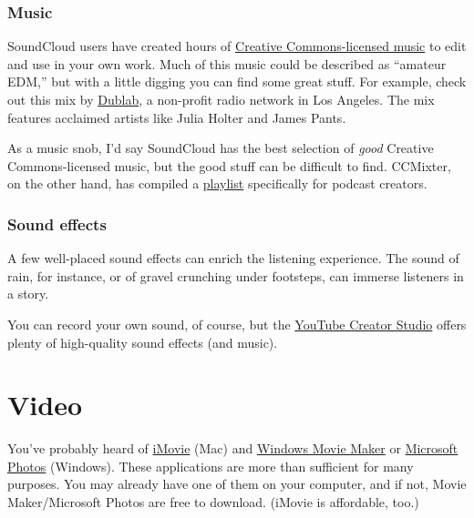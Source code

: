 \documentclass[]{book}
\theoremstyle{definition}
\theoremstyle{definition}
\theoremstyle{definition}
\theoremstyle{remark}
\begin{document}
\hypertarget{music}{%
\subsection{Music}\label{music}}

SoundCloud users have created hours of
\href{https://search.creativecommons.org/}{Creative Commons-licensed
music} to edit and use in your own work. Much of this music could be
described as ``amateur EDM,'' but with a little digging you can find
some great stuff. For example, check out this mix by
\href{https://soundcloud.com/wearecc/dublabs-cc10-mix}{Dublab}, a
non-profit radio network in Los Angeles. The mix features acclaimed
artists like Julia Holter and James Pants.

As a music snob, I'd say SoundCloud has the best selection of
\emph{good} Creative Commons-licensed music, but the good stuff can be
difficult to find. CCMixter, on the other hand, has compiled a
\href{http://dig.ccmixter.org/podcast_music}{playlist} specifically for
podcast creators.

\hypertarget{sound-effects}{%
\subsection{Sound effects}\label{sound-effects}}

A few well-placed sound effects can enrich the listening experience. The
sound of rain, for instance, or of gravel crunching under footsteps, can
immerse listeners in a story.

You can record your own sound, of course, but the
\href{https://www.youtube.com/audiolibrary/music?ar=1}{YouTube Creator
Studio} offers plenty of high-quality sound effects (and music).

\hypertarget{video}{%
\chapter{Video}\label{video}}

You've probably heard of \href{https://www.apple.com/imovie/}{iMovie}
(Mac) and
\href{https://www.microsoft.com/en-us/store/p/movie-maker-free-video-editor/9nblggh4wwjr}{Windows
Movie Maker} or
\href{https://www.microsoft.com/en-us/windows/photo-movie-editor}{Microsoft
Photos} (Windows). These applications are more than sufficient for many
purposes. You may already have one of them on your computer, and if not,
Movie Maker/Microsoft Photos are free to download. (iMovie is
affordable, too.)
\end{document}
